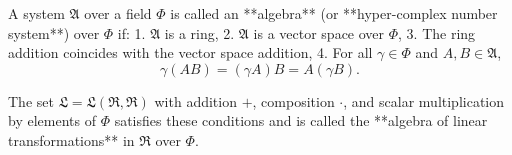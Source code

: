 A system $\mathfrak{A}$ over a field $\Phi$ is called an **algebra** (or **hyper-complex number system**) over $\Phi$ if:
1. $\mathfrak{A}$ is a ring,
2. $\mathfrak{A}$ is a vector space over $\Phi$,
3. The ring addition coincides with the vector space addition,
4. For all $\gamma \in \Phi$ and $A, B \in \mathfrak{A}$,
$$\gamma(AB) = (\gamma A)B = A(\gamma B).$$

The set $\mathfrak{L} = \mathfrak{L}(\mathfrak{R}, \mathfrak{R})$ with addition $+$, composition $\cdot$, and scalar multiplication by elements of $\Phi$ satisfies these conditions and is called the **algebra of linear transformations** in $\mathfrak{R}$ over $\Phi$.
